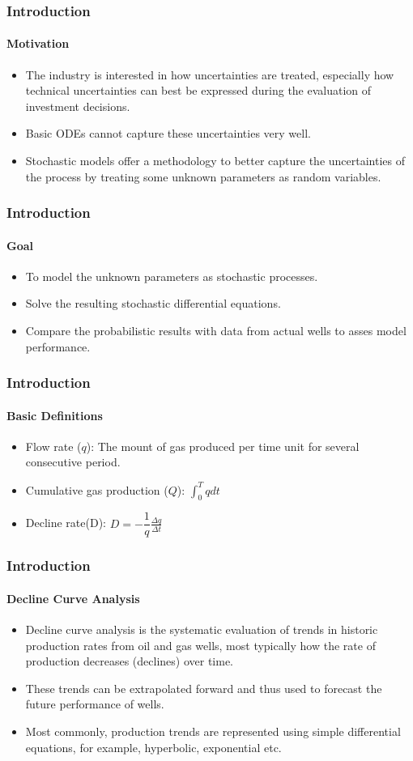 \documentclass[11pt]{beamer}
\begin{document}
\begin{frame}
	\frametitle{Introduction}
	\framesubtitle{Motivation}
	\begin{itemize}
		\item The industry is interested in how uncertainties are treated, especially how technical uncertainties can best be expressed during the evaluation of  investment decisions.
		\item Basic ODEs cannot capture these uncertainties very well.
		\item Stochastic models offer a methodology to better capture the uncertainties of the process by treating some unknown parameters as random variables.  
	\end{itemize}
\end{frame}


\begin{frame}
	
	\frametitle{Introduction}
	\framesubtitle{Goal}
	\begin{itemize}
		\item To model the unknown parameters as stochastic processes.
		\item Solve the resulting stochastic differential equations.
		\item Compare the probabilistic results with data from actual wells to asses model performance.
	\end{itemize}
\end{frame}


\begin{frame}
	\frametitle{Introduction}
	\framesubtitle{Basic Definitions}
	\justifying\begin{itemize}
	\item Flow rate ($q$): The mount of gas produced per time unit for several consecutive period.
	\item Cumulative gas production ($Q$): $\int_{0}^{T}qdt $	
	\item Decline rate(D): $D=-\dfrac{1}{q}\frac{\Delta q}{\Delta t}$	
	\end{itemize}
\end{frame}


\begin{frame}
	\frametitle{Introduction}
	\framesubtitle{Decline Curve Analysis}
	\begin{itemize}
		\item Decline curve analysis is the systematic evaluation of trends in historic production rates from oil and gas wells, most typically how the rate of production decreases (declines) over time.
		\item These trends can be extrapolated forward and thus used to forecast the future performance of wells.
		\item Most commonly, production trends are represented using simple differential equations, for example, hyperbolic, exponential etc.
	\end{itemize}
\end{frame}
\end{document}
